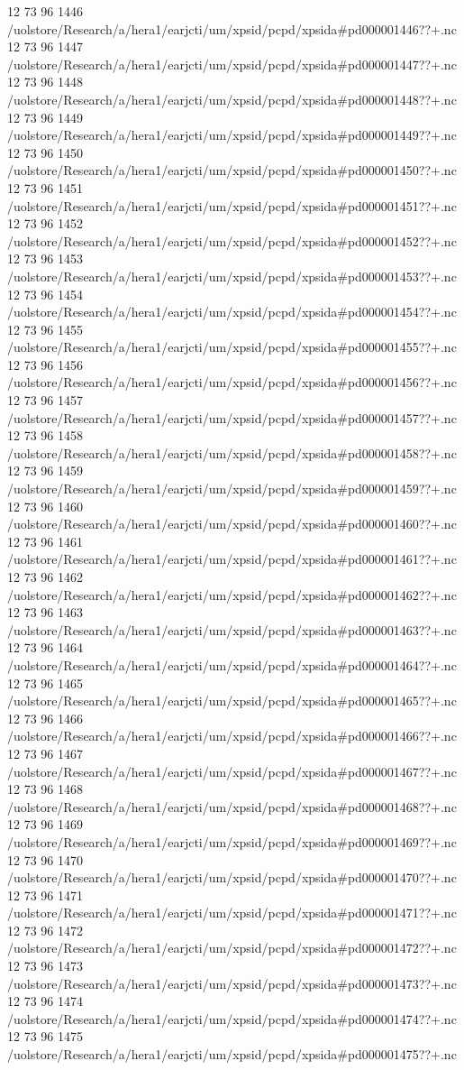 12 73 96
1446
/uolstore/Research/a/hera1/earjcti/um/xpsid/pcpd/xpsida#pd000001446??+.nc
12 73 96
1447
/uolstore/Research/a/hera1/earjcti/um/xpsid/pcpd/xpsida#pd000001447??+.nc
12 73 96
1448
/uolstore/Research/a/hera1/earjcti/um/xpsid/pcpd/xpsida#pd000001448??+.nc
12 73 96
1449
/uolstore/Research/a/hera1/earjcti/um/xpsid/pcpd/xpsida#pd000001449??+.nc
12 73 96
1450
/uolstore/Research/a/hera1/earjcti/um/xpsid/pcpd/xpsida#pd000001450??+.nc
12 73 96
1451
/uolstore/Research/a/hera1/earjcti/um/xpsid/pcpd/xpsida#pd000001451??+.nc
12 73 96
1452
/uolstore/Research/a/hera1/earjcti/um/xpsid/pcpd/xpsida#pd000001452??+.nc
12 73 96
1453
/uolstore/Research/a/hera1/earjcti/um/xpsid/pcpd/xpsida#pd000001453??+.nc
12 73 96
1454
/uolstore/Research/a/hera1/earjcti/um/xpsid/pcpd/xpsida#pd000001454??+.nc
12 73 96
1455
/uolstore/Research/a/hera1/earjcti/um/xpsid/pcpd/xpsida#pd000001455??+.nc
12 73 96
1456
/uolstore/Research/a/hera1/earjcti/um/xpsid/pcpd/xpsida#pd000001456??+.nc
12 73 96
1457
/uolstore/Research/a/hera1/earjcti/um/xpsid/pcpd/xpsida#pd000001457??+.nc
12 73 96
1458
/uolstore/Research/a/hera1/earjcti/um/xpsid/pcpd/xpsida#pd000001458??+.nc
12 73 96
1459
/uolstore/Research/a/hera1/earjcti/um/xpsid/pcpd/xpsida#pd000001459??+.nc
12 73 96
1460
/uolstore/Research/a/hera1/earjcti/um/xpsid/pcpd/xpsida#pd000001460??+.nc
12 73 96
1461
/uolstore/Research/a/hera1/earjcti/um/xpsid/pcpd/xpsida#pd000001461??+.nc
12 73 96
1462
/uolstore/Research/a/hera1/earjcti/um/xpsid/pcpd/xpsida#pd000001462??+.nc
12 73 96
1463
/uolstore/Research/a/hera1/earjcti/um/xpsid/pcpd/xpsida#pd000001463??+.nc
12 73 96
1464
/uolstore/Research/a/hera1/earjcti/um/xpsid/pcpd/xpsida#pd000001464??+.nc
12 73 96
1465
/uolstore/Research/a/hera1/earjcti/um/xpsid/pcpd/xpsida#pd000001465??+.nc
12 73 96
1466
/uolstore/Research/a/hera1/earjcti/um/xpsid/pcpd/xpsida#pd000001466??+.nc
12 73 96
1467
/uolstore/Research/a/hera1/earjcti/um/xpsid/pcpd/xpsida#pd000001467??+.nc
12 73 96
1468
/uolstore/Research/a/hera1/earjcti/um/xpsid/pcpd/xpsida#pd000001468??+.nc
12 73 96
1469
/uolstore/Research/a/hera1/earjcti/um/xpsid/pcpd/xpsida#pd000001469??+.nc
12 73 96
1470
/uolstore/Research/a/hera1/earjcti/um/xpsid/pcpd/xpsida#pd000001470??+.nc
12 73 96
1471
/uolstore/Research/a/hera1/earjcti/um/xpsid/pcpd/xpsida#pd000001471??+.nc
12 73 96
1472
/uolstore/Research/a/hera1/earjcti/um/xpsid/pcpd/xpsida#pd000001472??+.nc
12 73 96
1473
/uolstore/Research/a/hera1/earjcti/um/xpsid/pcpd/xpsida#pd000001473??+.nc
12 73 96
1474
/uolstore/Research/a/hera1/earjcti/um/xpsid/pcpd/xpsida#pd000001474??+.nc
12 73 96
1475
/uolstore/Research/a/hera1/earjcti/um/xpsid/pcpd/xpsida#pd000001475??+.nc
